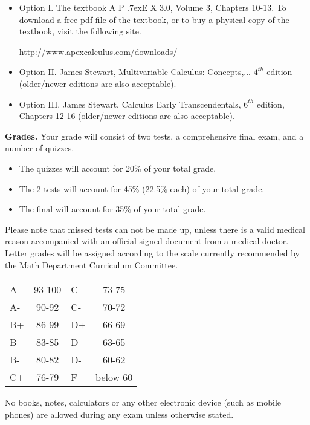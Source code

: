 \documentclass{article}
\newcommand{\apex}{A\kern -1pt \lower -2pt\hbox{P}\kern -4pt \lower .7ex\hbox{E}\kern -1pt X}
\begin{document}
\begin{itemize}
\item Option I. The textbook \apex{} 3.0, Volume 3, Chapters 10-13. To download a free pdf file of the textbook, or to buy a physical copy of the textbook, visit the following site.

\url{http://www.apexcalculus.com/downloads/} 
\item Option II. James Stewart, Multivariable Calculus: Concepts,...  $4^{th}$ edition (older/newer editions are also acceptable).

\item Option III. James Stewart, Calculus Early Transcendentals, $6^{th}$ edition, Chapters 12-16 (older/newer editions are also acceptable).
\end{itemize}



\medskip
\noindent \textbf{Grades.} Your grade will consist of two tests, a comprehensive final exam, and a number of quizzes. 
\begin{itemize}
\item The quizzes will account for 20\% of your total grade.
\item The 2 tests will account for 45\% (22.5\% each) of your total grade.
\item The final will account for 35\% of your total grade.
\end{itemize}
Please note that missed tests can not be made up, unless there is a valid medical reason accompanied with an official signed document from a medical doctor. Letter grades will be assigned according to the scale currently recommended by the Math Department Curriculum Committee. 

\begin{center}
\begin{tabular}{lc|lc}
A & 93-100 & C  & 73-75 \\
A-& 90-92  & C- & 70-72 \\
B+& 86-99  & D+ & 66-69 \\
B & 83-85  & D  & 63-65\\
B-& 80-82  & D- & 60-62\\
C+& 76-79  & F  & below 60\\
\end{tabular}

\end{center}

No books, notes, calculators or any other electronic device (such as mobile phones) are allowed during any exam unless otherwise stated.
\end{document}
